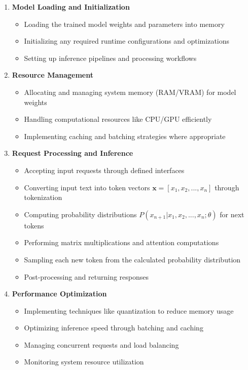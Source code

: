 \begin{enumerate}
\item \textbf{Model Loading and Initialization}
\begin{itemize}
    \item Loading the trained model weights and parameters into memory
    \item Initializing any required runtime configurations and optimizations
    \item Setting up inference pipelines and processing workflows
\end{itemize}

\item \textbf{Resource Management}
\begin{itemize}
    \item Allocating and managing system memory (RAM/VRAM) for model weights
    \item Handling computational resources like CPU/GPU efficiently
    \item Implementing caching and batching strategies where appropriate
\end{itemize}

\item \textbf{Request Processing and Inference}
\begin{itemize}
    \item Accepting input requests through defined interfaces
    \item Converting input text into token vectors $\mathbf{x} = [x_1, x_2, ..., x_n]$ through tokenization
    \item Computing probability distributions $P(x_{n+1}|x_1, x_2, ..., x_n; \theta)$ for next tokens
    \item Performing matrix multiplications and attention computations
    \item Sampling each new token from the calculated probability distribution
    \item Post-processing and returning responses
\end{itemize}

\item \textbf{Performance Optimization}
\begin{itemize}
    \item Implementing techniques like quantization to reduce memory usage
    \item Optimizing inference speed through batching and caching
    \item Managing concurrent requests and load balancing
    \item Monitoring system resource utilization
\end{itemize}
\end{enumerate}

